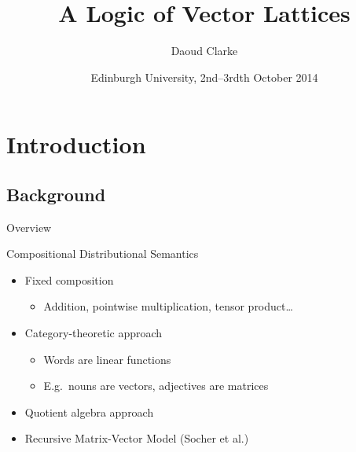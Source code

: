 \documentclass{beamer}
\title%
{A Logic of Vector Lattices}
\author[Department of Informatics, University of Sussex] %
{Daoud Clarke}
\institute[University of Sussex] %
{
  Department of Informatics\\
  University of Sussex}
\date[Edinburgh] %
{Edinburgh University, 2nd--3rdth October 2014}
\newlength{\wideitemsep}
\let\olditem\item
\renewcommand{\item}{\setlength{\itemsep}{\wideitemsep}\olditem}
\begin{document}
\begin{frame}
  \titlepage
\end{frame}

\section{Introduction}
\subsection{Background}

\begin{frame}{Overview}
  \tableofcontents
\end{frame}





\begin{frame}{Compositional Distributional Semantics}
\begin{itemize}
\item Fixed composition
\begin{itemize}
\item Addition, pointwise multiplication, tensor product\ldots
\end{itemize}
\item Category-theoretic approach
\begin{itemize}
\item Words are linear functions
\item E.g.~nouns are vectors, adjectives are matrices
\end{itemize}
\item Quotient algebra approach
\item Recursive Matrix-Vector Model (Socher et al.)
\end{itemize}
\end{frame}
\end{document}
